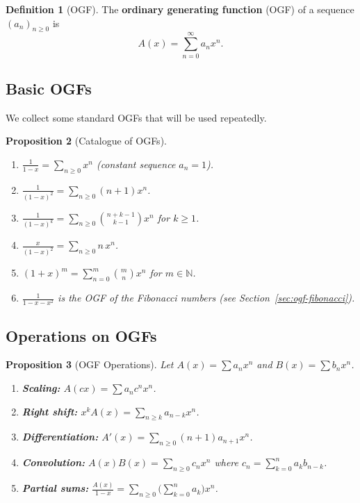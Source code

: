 \documentclass[12pt,a4paper,openany]{book}
\theoremstyle{definition}
\newtheorem{definition}{Definition}[chapter]
\theoremstyle{plain}
\newtheorem{proposition}[definition]{Proposition}
\theoremstyle{remark}
\newcommand{\N}{\mathbb{N}}
\begin{document}
\begin{definition}[OGF]\label{def:ogf}
The \textbf{ordinary generating function} (OGF) of a sequence
$(a_n)_{n \ge 0}$ is
\[
  A(x) = \sum_{n=0}^{\infty} a_n x^n.
\]
\end{definition}

\subsection{Basic OGFs}\label{ssec:basic-ogfs}

We collect some standard OGFs that will be used repeatedly.

\begin{proposition}[Catalogue of OGFs]\label{prop:ogf-catalogue}
\begin{enumerate}[label=(\roman*)]
  \item $\displaystyle\frac{1}{1-x} = \sum_{n\ge 0}x^n$
    \quad (constant sequence $a_n = 1$).
  \item $\displaystyle\frac{1}{(1-x)^2} = \sum_{n\ge 0}(n+1)x^n$.
  \item $\displaystyle\frac{1}{(1-x)^k} = \sum_{n\ge 0}
    \binom{n+k-1}{k-1}x^n$ \quad for $k \ge 1$.
  \item $\displaystyle\frac{x}{(1-x)^2} = \sum_{n\ge 0}n\,x^n$.
  \item $(1+x)^m = \sum_{n=0}^{m}\binom{m}{n}x^n$ \quad for
    $m \in \N$.
  \item $\displaystyle\frac{1}{1-x-x^2}$ is the OGF of the
    Fibonacci numbers (see Section~\ref{sec:ogf-fibonacci}).
\end{enumerate}
\end{proposition}

\subsection{Operations on OGFs}\label{ssec:ogf-operations}

\begin{proposition}[OGF Operations]\label{prop:ogf-ops}
Let $A(x) = \sum a_n x^n$ and $B(x) = \sum b_n x^n$.
\begin{enumerate}[label=(\roman*)]
  \item \textbf{Scaling:} $A(cx) = \sum a_n c^n x^n$.
  \item \textbf{Right shift:} $x^k A(x) = \sum_{n\ge k} a_{n-k} x^n$.
  \item \textbf{Differentiation:} $A'(x) = \sum_{n\ge 0}(n+1)a_{n+1}x^n$.
  \item \textbf{Convolution:} $A(x)B(x) = \sum_{n\ge 0}c_n x^n$
    where $c_n = \sum_{k=0}^n a_k b_{n-k}$.
  \item \textbf{Partial sums:} $\frac{A(x)}{1-x} = \sum_{n\ge 0}
    \bigl(\sum_{k=0}^n a_k\bigr)x^n$.
\end{enumerate}
\end{proposition}
\end{document}
